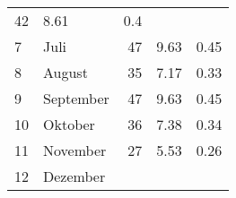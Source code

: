 \begin{longtable}{lXrrr}
       \num{42} &
       \num[round-mode=places,round-precision=2]{8,61} &
         \num[round-mode=places,round-precision=2]{0,4} \\

     7 &
     \multicolumn{1}{X}{ Juli   } &


       \num{47} &
       \num[round-mode=places,round-precision=2]{9,63} &
         \num[round-mode=places,round-precision=2]{0,45} \\

     8 &
     \multicolumn{1}{X}{ August   } &


       \num{35} &
       \num[round-mode=places,round-precision=2]{7,17} &
         \num[round-mode=places,round-precision=2]{0,33} \\

     9 &
     \multicolumn{1}{X}{ September   } &


       \num{47} &
       \num[round-mode=places,round-precision=2]{9,63} &
         \num[round-mode=places,round-precision=2]{0,45} \\

     10 &
     \multicolumn{1}{X}{ Oktober   } &


       \num{36} &
       \num[round-mode=places,round-precision=2]{7,38} &
         \num[round-mode=places,round-precision=2]{0,34} \\

     11 &
     \multicolumn{1}{X}{ November   } &


       \num{27} &
       \num[round-mode=places,round-precision=2]{5,53} &
         \num[round-mode=places,round-precision=2]{0,26} \\

     12 &
     \multicolumn{1}{X}{ Dezember   } &



\end{longtable}
